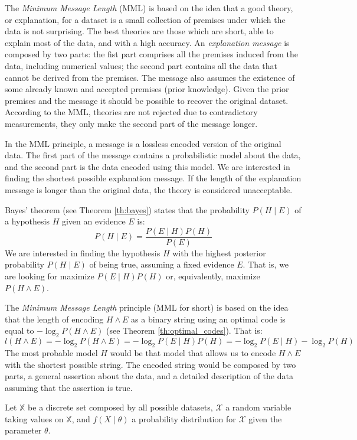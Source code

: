 The \emph{Minimum Message Length} (MML) is based on the idea that a good theory, or explanation, for a dataset is a small collection of premises under which the data is not surprising. The best theories are those which are short, able to explain most of the data, and with a high accuracy. An \emph{explanation message} is composed by two parts: the fist part comprises all the premises induced from the data, including numerical values; the second part contains all the data that cannot be derived from the premises. The message also assumes the existence of some already known and accepted premises (prior knowledge). Given the prior premises and the message it should be possible to recover the original dataset. According to the MML, theories are not rejected due to contradictory measurements, they only make the second part of the message longer.

In the MML principle, a message is a lossless encoded version of the original data. The first part of the message contains a probabilistic model about the data, and the second part is the data encoded using this model. We are interested in finding the shortest possible explanation message. If the length of the explanation message is longer than the original data, the theory is considered unacceptable.

Bayes' theorem (see Theorem \ref{th:bayes}) states that the probability $P(H \mid E)$ of a hypothesis $H$ given an evidence $E$ is:
\[
    P(H \mid E) = \frac{ P( E \mid H ) P(H) }{ P(E) }
\]
We are interested in finding the hypothesis $H$ with the highest posterior probability $P(H \mid E)$ of being true, assuming a fixed evidence $E$. That is, we are looking for maximize $P( E \mid H ) P(H)$ or, equivalently, maximize $P ( H \wedge E )$.

The \emph{Minimum Message Length} principle (MML for short) is based on the idea that the length of encoding $H \wedge E$ as a binary string using an optimal code is equal to $- \log_2 P ( H \wedge E )$ (see Theorem \ref{th:optimal_codes}). That is:
\[
    l(H \wedge E) = - \log_2 P ( H \wedge E ) = - \log_2 P( E \mid H ) P(H) = - \log_2 P( E \mid H ) - \log_2 P(H)
\]
The most probable model $H$ would be that model that allows us to encode $H \wedge E$ with the shortest possible string. The encoded string would be composed by two parts, a general assertion about the data, and a detailed description of the data assuming that the assertion is true.

Let $\mathbb{X}$ be a discrete set composed by all possible datasets, $\mathcal{X}$ a random variable taking values on $\mathbb{X}$, and $f(X \mid \theta)$ a probability distribution for $\mathcal{X}$ given the parameter $\theta$.

